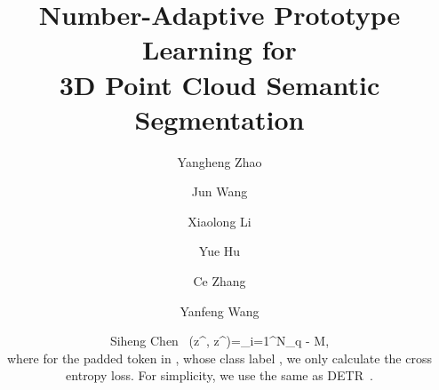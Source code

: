 \documentclass[runningheads]{llncs}
\begin{document}
\pagestyle{headings}
\mainmatter
\def\ECCVSubNumber{}  

\title{Number-Adaptive Prototype Learning for \\ 3D Point Cloud Semantic Segmentation}

\begin{comment}
\titlerunning{ECCV-22 submission ID \ECCVSubNumber} 
\authorrunning{ECCV-22 submission ID \ECCVSubNumber} 
\author{Anonymous ECCV submission}
\institute{}
\end{comment}


\author{Yangheng Zhao \and
Jun Wang \and
Xiaolong Li \and
Yue Hu \and
Ce Zhang \and 
Yanfeng Wang  \and
Siheng Chen  
\
    (z^{\prime}, z^{})=\sum_{i=1}^{N_q - M},

where for the padded token in , whose class label , we only calculate the cross entropy loss. 
For simplicity, we use the same  as DETR~\cite{carion2020end}.


}
\end{document}
